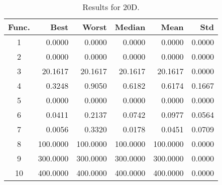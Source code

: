 \begin{table}[ht]
\centering
\caption{ Results for 20D. }
\label{tab:20D}
\begin{tabular}{crrrrr}
\hline
{Func.} & Best & Worst & Median & Mean & Std \\
\hline
1 & 0.0000 & 0.0000 & 0.0000 & 0.0000 & 0.0000 \\
2 & 0.0000 & 0.0000 & 0.0000 & 0.0000 & 0.0000 \\
3 & 20.1617 & 20.1617 & 20.1617 & 20.1617 & 0.0000 \\
4 & 0.3248 & 0.9050 & 0.6182 & 0.6174 & 0.1667 \\
5 & 0.0000 & 0.0000 & 0.0000 & 0.0000 & 0.0000 \\
6 & 0.0411 & 0.2137 & 0.0742 & 0.0977 & 0.0564 \\
7 & 0.0056 & 0.3320 & 0.0178 & 0.0451 & 0.0709 \\
8 & 100.0000 & 100.0000 & 100.0000 & 100.0000 & 0.0000 \\
9 & 300.0000 & 300.0000 & 300.0000 & 300.0000 & 0.0000 \\
10 & 400.0000 & 400.0000 & 400.0000 & 400.0000 & 0.0000 \\
\hline
\end{tabular}
\end{table}
